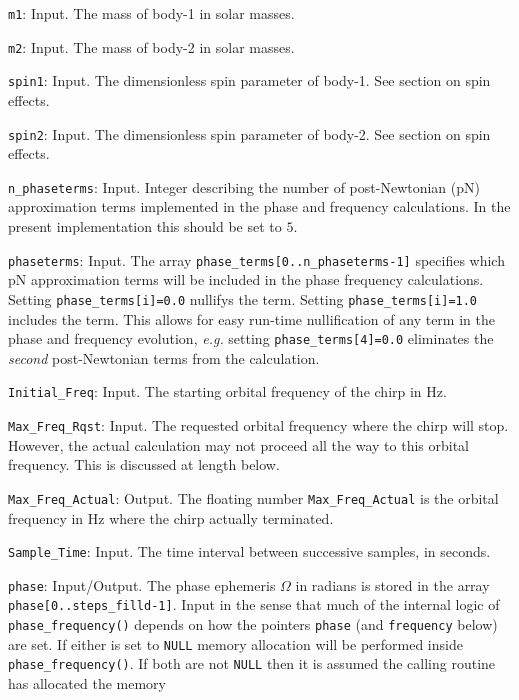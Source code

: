 \begin{description}
\item{\tt m1}: Input.  The mass of body-1 in solar masses.
\item{\tt m2}: Input.  The mass of body-2 in solar masses.
\item{\tt spin1}: Input.  The dimensionless spin parameter 
  of body-1. See section on spin effects.
\item{\tt spin2}: Input.  The dimensionless spin parameter 
  of body-2. See section on spin effects.
\item{\tt n\_phaseterms}: Input. Integer describing
 the number of post-Newtonian (pN) approximation terms implemented in
 the phase and frequency calculations. In the present implementation
 this should be set to $5$.
\item{\tt phaseterms}: Input. The array 
  {\tt phase\_terms[0..n\_phaseterms-1]} specifies which pN
  approximation terms will be included in the phase frequency
  calculations.  Setting  {\tt phase\_terms[i]=0.0} nullifys the term.
  Setting  {\tt phase\_terms[i]=1.0} includes the term.  This allows
  for easy run-time nullification of any term in the phase and
  frequency evolution, {\it e.g.} setting {\tt phase\_terms[4]=0.0}
  eliminates the {\it second} post-Newtonian terms from the
  calculation.
\item{\tt Initial\_Freq}: Input.  The starting orbital frequency of the
  chirp in Hz.
\item{\tt Max\_Freq\_Rqst}: Input.  The requested orbital frequency
  where the chirp will stop. However, the actual calculation
  may not proceed all the way to this orbital frequency.  This is 
  discussed at length below.
\item{\tt Max\_Freq\_Actual}: Output. The floating 
  number {\tt *Max\_Freq\_Actual}
  is the orbital frequency in Hz where the chirp actually terminated.
\item{\tt Sample\_Time}: Input.  The time interval between successive samples,
  in seconds.
\item{\tt phase}: Input/Output. The phase ephemeris $\Omega$ in radians
  is stored in the array {\tt *phase[0..steps\_filld-1]}.
  Input in the sense that much of the internal logic of 
  {\tt  phase\_frequency()} depends on how the pointers {\tt *phase}
  (and {\tt *frequency} below) are set.
  If either is set to {\tt NULL} memory allocation will be performed
  inside  {\tt  phase\_frequency()}. If both are not {\tt NULL}
  then it is assumed the calling routine has allocated the memory

\end{description}
